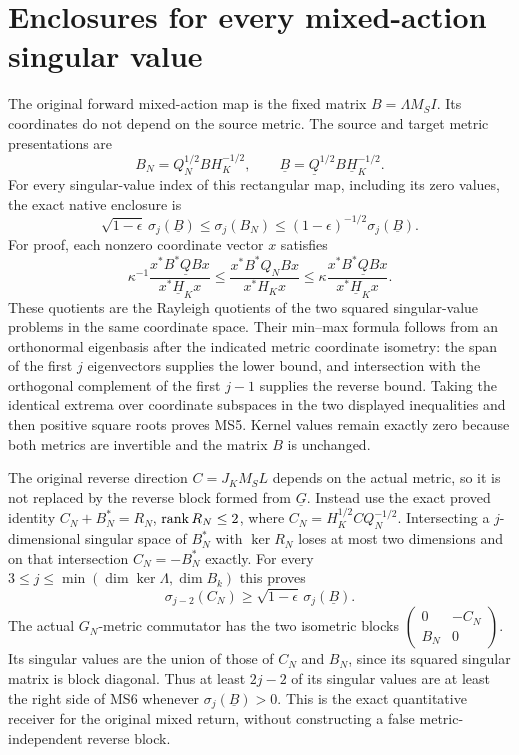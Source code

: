 \section{Enclosures for every mixed-action singular value}
The original forward mixed-action map is the fixed matrix
$B=\Lambda M_S I$. Its coordinates do not depend on the source
metric. The source and target metric presentations are
\[
 B_N=Q_N^{1/2}BH_K^{-1/2},\qquad
 \underline B=\underline Q^{1/2}B\underline H_K^{-1/2}.
 \tag{MS4}
\]
For every singular-value index of this rectangular map, including
its zero values, the exact native enclosure is
\[
 \boxed{\sqrt{1-\epsilon}\,\sigma_j(\underline B)
       \le\sigma_j(B_N)
       \le(1-\epsilon)^{-1/2}\sigma_j(\underline B).}
 \tag{MS5}
\]
For proof, each nonzero coordinate vector $x$ satisfies
\[
 \kappa^{-1}\frac{x^*B^*\underline QBx}{x^*\underline H_Kx}
 \le\frac{x^*B^*Q_NBx}{x^*H_Kx}
 \le\kappa\frac{x^*B^*\underline QBx}{x^*\underline H_Kx}.
\]
These quotients are the Rayleigh quotients of the two squared
singular-value problems in the same coordinate space. Their
min--max formula follows from an orthonormal eigenbasis after
the indicated metric coordinate isometry: the span of the first
$j$ eigenvectors supplies the lower bound, and intersection with
the orthogonal complement of the first $j-1$ supplies the reverse
bound. Taking the identical extrema over coordinate subspaces
in the two displayed inequalities and then positive square roots
proves MS5. Kernel values remain exactly zero because both metrics
are invertible and the matrix $B$ is unchanged.

The original reverse direction $C=J_KM_SL$ depends on the actual
metric, so it is not replaced by the reverse block formed from
$\underline G$. Instead use the exact proved identity
$C_N+B_N^*=R_N$, $\operatorname{rank} R_N\le2$, where
$C_N=H_K^{1/2}CQ_N^{-1/2}$. Intersecting a $j$-dimensional
singular space of $B_N^*$ with $\ker R_N$ loses at most two
dimensions and on that intersection $C_N=-B_N^*$ exactly.
For every $3\le j\le\min(\dim\ker\Lambda,\dim B_k)$ this proves
\[
 \boxed{\sigma_{j-2}(C_N)
          \ge\sqrt{1-\epsilon}\,\sigma_j(\underline B).}
 \tag{MS6}
\]
The actual $G_N$-metric commutator has the two isometric blocks
$\left(\begin{smallmatrix}0&-C_N\\B_N&0\end{smallmatrix}\right)$.
Its singular values are the union of those of $C_N$ and $B_N$,
since its squared singular matrix is block diagonal. Thus at
least $2j-2$ of its singular values are at least the right side
of MS6 whenever $\sigma_j(\underline B)>0$. This is the exact
quantitative receiver for the original mixed return, without
constructing a false metric-independent reverse block.

